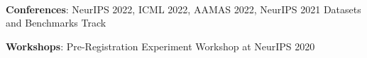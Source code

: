 \documentclass[]{lukas-cv-openfont}
\begin{document}
\noindent
{}
\\
\tinysectionsep




\noindent
\begin{tightitemize}{1.0em}
\item \textbf{Conferences}: NeurIPS 2022, ICML 2022, AAMAS 2022, NeurIPS 2021 Datasets and Benchmarks Track
\item \textbf{Workshops}: Pre-Registration Experiment Workshop at NeurIPS 2020
\end{tightitemize}
\largesectionsep



\end{document}
